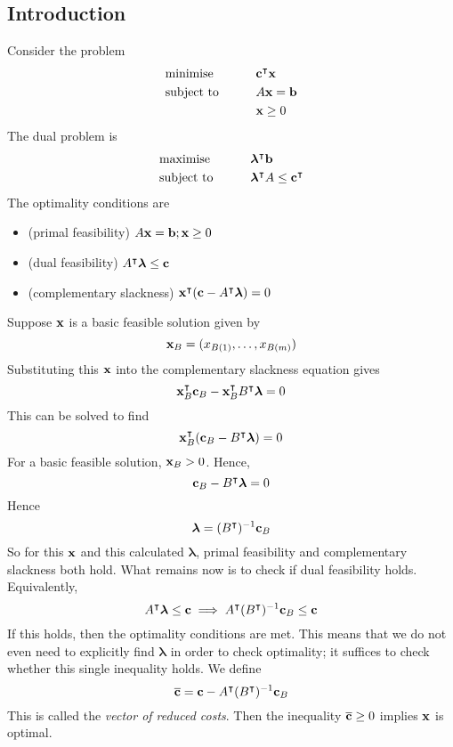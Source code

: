 \subsection{Introduction}
Consider the problem
\begin{alignat*}{2}
	 & \text{minimise}   & \qquad & \vb c^\intercal \vb x \\
	 & \text{subject to} &        & A \vb x = \vb b        \\
	 &                   &        & \vb x \geq 0
\end{alignat*}
The dual problem is
\begin{alignat*}{2}
	 & \text{maximise}   & \qquad & \bm \lambda^\intercal \vb b                   \\
	 & \text{subject to} &        & \bm \lambda^\intercal A \leq \vb c^\intercal \\
\end{alignat*}
The optimality conditions are
\begin{itemize}
	\item (primal feasibility) \( A \vb x = \vb b; \vb x \geq 0 \)
	\item (dual feasibility) \( A^\intercal \bm \lambda \leq \vb c \)
	\item (complementary slackness) \( \vb x^\intercal (\vb c - A^\intercal \bm \lambda) = 0 \)
\end{itemize}
Suppose \( \vb x \) is a basic feasible solution given by
\[
	\vb x_B = (x_{B(1)}, \dots, x_{B(m)})
\]
Substituting this \( \vb x \) into the complementary slackness equation gives
\[
	\vb x_B^\intercal \vb c_B - \vb x_B^\intercal B^\intercal \bm \lambda = 0
\]
This can be solved to find
\[
	\vb x_B^\intercal (\vb c_B - B^\intercal \bm \lambda) = 0
\]
For a basic feasible solution, \( \vb x_B > 0 \).
Hence,
\[
	\vb c_B - B^\intercal \bm \lambda = 0
\]
Hence
\[
	\bm \lambda = (B^\intercal)^{-1} \vb c_B
\]
So for this \( \vb x \) and this calculated \( \bm \lambda \), primal feasibility and complementary slackness both hold.
What remains now is to check if dual feasibility holds.
Equivalently,
\[
	A^\intercal \bm \lambda \leq \vb c \implies A^\intercal (B^\intercal)^{-1} \vb c_B \leq \vb c
\]
If this holds, then the optimality conditions are met.
This means that we do not even need to explicitly find \( \bm \lambda \) in order to check optimality; it suffices to check whether this single inequality holds.
We define
\[
	\overline{\vb c} = \vb c - A^\intercal (B^\intercal)^{-1} \vb c_B
\]
This is called the \textit{vector of reduced costs}.
Then the inequality \( \overline{\vb c} \geq 0 \) implies \( \vb x \) is optimal.

